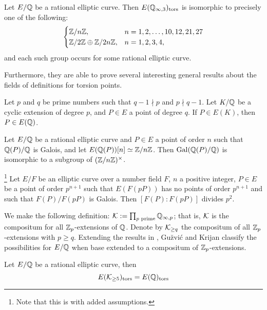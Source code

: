 \begin{thm}
Let $E/\mathbb{Q}$ be a rational elliptic curve. Then $E(\mathbb{Q}_{\infty,3})_{\text{tors}}$ is isomorphic to precisely one of the following:
	\[
	\begin{cases}
	\mathbb{Z}/n\mathbb{Z},& n= 1, 2, \ldots, 10, 12, 21, 27 \\
	\mathbb{Z}/2\mathbb{Z} \oplus \mathbb{Z}/2n\mathbb{Z},& n= 1, 2, 3, 4,
	\end{cases}
	\]
and each such group occurs for some rational elliptic curve. 
\end{thm}


Furthermore, they are able to prove several interesting general results about the fields of definitions for torsion points. 


\begin{lem}
Let $p$ and $q$ be prime numbers such that $q - 1 \nmid p$ and $p \nmid q - 1$. Let $K/\mathbb{Q}$ be a cyclic extension of degree $p$, and $P \in E$ a point of degree $q$. If $P \in E(K)$, then $P \in E(\mathbb{Q})$. 
\end{lem}


\begin{lem}
Let $E/\mathbb{Q}$ be a rational elliptic curve and $P \in E$ a point of order $n$ such that $\mathbb{Q}(P)/\mathbb{Q}$ is Galois, and let $E(\mathbb{Q}(P))[n] \simeq \mathbb{Z}/n\mathbb{Z}$. Then $\operatorname{Gal}(\mathbb{Q}(P)/\mathbb{Q})$ is isomorphic to a subgroup of $(\mathbb{Z}/n\mathbb{Z})^\times$. 
\end{lem}


\begin{prop}\footnote{Note that this is \cite[Prop.~4.6]{gonzalezjimeneznajman20base} with added assumptions.}
Let $E/F$ be an elliptic curve over a number field $F$, $n$ a positive integer, $P \in E$ be a point of order $p^{n+1}$ such that $E(F(pP))$ has no points of order $p^{n+1}$ and such that $F(P)/F(pP)$ is Galois. Then $[F(P) \colon F(pP)]$ divides $p^2$.
\end{prop}


We make the following definition: $\mathcal{K}:= \prod_{p \text{ prime}} \mathbb{Q}_{\infty,p}$;
that is, $\mathcal{K}$ is the compositum for all $\mathbb{Z}_p$-extensions of $\mathbb{Q}$. Denote by $\mathcal{K}_{\geq q}$ the compositum of all $\mathbb{Z}_p$-extensions with $p \geq q$. Extending the results in \cite{choudanielskrijannajman21}, Gu{\u{z}}vi\'c and Krijan classify the possibilities for $E/\mathbb{Q}$ when base extended to a compositum of $\mathbb{Z}_p$-extensions. 


\begin{thm}
Let $E/\mathbb{Q}$ be a rational elliptic curve, then
	\[
	E(\mathcal{K}_{\geq 5})_{\text{tors}}= E(\mathbb{Q})_{\text{tors}}
	\]
\end{thm}


